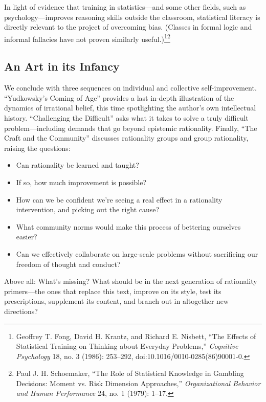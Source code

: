 {
 In light of evidence that training in statistics---and some other
fields, such as psychology---improves reasoning skills outside the
classroom, statistical literacy is directly relevant to the project of
overcoming bias. (Classes in formal logic and informal fallacies have
not proven similarly useful.)\footnote{Geoffrey T. Fong, David H. Krantz, and Richard E. Nisbett,
``The Effects of Statistical Training on Thinking
about Everyday Problems,'' \textit{Cognitive
Psychology} 18, no. 3 (1986): 253--292,
doi:10.1016/0010-0285(86)90001-0.}\supercomma\footnote{Paul J. H. Schoemaker, ``The Role of
Statistical Knowledge in Gambling Decisions: Moment vs. Risk Dimension
Approaches,'' \textit{Organizational Behavior and
Human Performance} 24, no. 1 (1979): 1--17.}}

\subsection{An Art in its Infancy}

{
 We conclude with three sequences on individual and collective
self-improvement. ``Yudkowsky's Coming
of Age'' provides a last in-depth illustration of the
dynamics of irrational belief, this time spotlighting the
author's own intellectual history.
``Challenging the Difficult'' asks
what it takes to solve a truly difficult problem---including demands
that go beyond epistemic rationality. Finally, ``The
Craft and the Community'' discusses rationality
groups and group rationality, raising the questions:}

\begin{itemize}
\item {
 Can rationality be learned and taught?}

\item {
 If so, how much improvement is possible?}

\item {
 How can we be confident we're seeing a real effect
in a rationality intervention, and picking out the right cause?}

\item {
 What community norms would make this process of bettering
ourselves easier?}

\item {
 Can we effectively collaborate on large-scale problems without
 sacrificing our freedom of thought and conduct?}
\end{itemize}

{
 Above all: What's missing? What should be in the
next generation of rationality primers---the ones that replace this
text, improve on its style, test its prescriptions, supplement its
content, and branch out in altogether new directions?}

